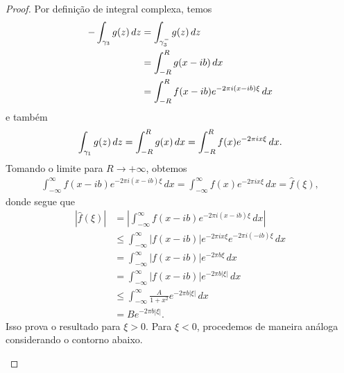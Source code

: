 \begin{proof}
            Por definição de integral complexa, temos
            \begin{align*}
                -\int_{\gamma_3} g(z) \, dz &= \int_{\gamma_3^-} g(z) \, dz \\
                                            &= \int_{-R}^R g(x-ib) \, dx \\
                                            &= \int_{-R}^R f(x-ib)e^{-2\pi i(x-ib)\xi} \, dx
            \end{align*}
            e também
            \begin{equation*}
                \int_{\gamma_1} g(z) \, dz = \int_{-R}^R g(x) \, dx = \int_{-R}^R f(x)e^{-2\pi ix\xi} \, dx.
            \end{equation*}
            Tomando o limite para $R\to +\infty$, obtemos
            \begin{align*}
                \int_{-\infty}^{\infty} f(x-ib)e^{-2\pi i(x-ib)\xi} \, dx
                =
                \int_{-\infty}^{\infty} f(x)e^{-2\pi ix\xi} \, dx
                =
                \widehat{f}(\xi),
            \end{align*}
            donde segue que
            \begin{align*}
                |\widehat{f}(\xi)| &=\left|\int_{-\infty}^{\infty} f(x-ib)e^{-2\pi i(x-ib)\xi} \, dx\right| \\
                                   &\leq\int_{-\infty}^{\infty}|f(x-ib)|e^{-2\pi ix\xi}e^{-2\pi i(-ib)\xi}\,dx \\
                                   &= \int_{-\infty}^{\infty}|f(x-ib)|e^{-2\pi b\xi} \,dx \\
                                   &= \int_{-\infty}^{\infty}|f(x-ib)|e^{-2\pi b|\xi|} \,dx \\
                                   &\leq \int_{-\infty}^{\infty} \frac{A}{1+x^2}e^{-2\pi b|\xi|} \, dx \\
                                   &= Be^{-2\pi b|\xi|}.
            \end{align*}
            Isso prova o resultado para $\xi > 0$. Para $\xi < 0$, procedemos de maneira análoga considerando
            o contorno abaixo.
            \begin{figure}[H]
				\centering 
\end{figure}
\end{proof}
